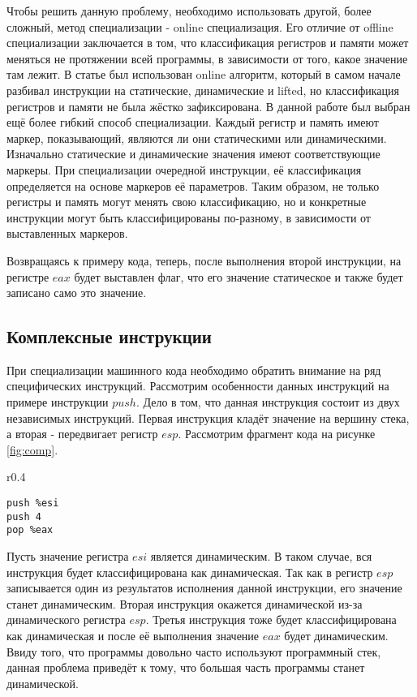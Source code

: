 Чтобы решить данную проблему, необходимо использовать другой, более сложный, метод специализации - online специализация. Его отличие от offline специализации заключается в том, что классификация регистров и памяти может меняться не протяжении всей программы, в зависимости от того, какое значение там лежит. В статье \cite{PEMC} был использован online алгоритм, который в самом начале разбивал инструкции на статические, динамические и lifted, но классификация регистров и памяти не была жёстко зафиксирована. В данной работе был выбран ещё более гибкий способ специализации. Каждый регистр и память имеют маркер, показывающий, являются ли они статическими или динамическими. Изначально статические и динамические значения имеют соответствующие маркеры. При специализации очередной инструкции, её классификация определяется на основе маркеров её параметров. Таким образом, не только регистры и память могут менять свою классификацию, но и конкретные инструкции могут быть классифицированы по-разному, в зависимости от выставленных маркеров.

Возвращаясь к примеру кода, теперь, после выполнения второй инструкции, на регистре $eax$ будет выставлен флаг, что его значение статическое и также будет записано само это значение.

\subsection{ Комплексные инструкции}
\label{part:4.2}
При специализации машинного кода необходимо обратить внимание на ряд специфических инструкций. Рассмотрим особенности данных инструкций на примере инструкции $push$. Дело в том, что данная инструкция состоит из двух независимых инструкций. Первая инструкция кладёт значение на вершину стека, а вторая - передвигает регистр $esp$. Рассмотрим фрагмент кода на рисунке \ref{fig:comp}.
\begin{wrapfigure}{r}{0.4\textwidth}
\begin{lstlisting}[xleftmargin = 20pt]
push %esi
push 4
pop %eax
\end{lstlisting}
\caption{Фрагмент кода}
\label{fig:comp}
\end{wrapfigure}
Пусть значение регистра $esi$ является динамическим. В таком случае, вся инструкция будет классифицирована как динамическая. Так как в регистр $esp$ записывается один из результатов исполнения данной инструкции, его значение станет динамическим. Вторая инструкция окажется динамической из-за динамического регистра $esp$. Третья инструкция тоже будет классифицирована как  динамическая и после её выполнения значение $eax$ будет динамическим. Ввиду того, что программы довольно часто используют программный стек, данная проблема приведёт к тому, что большая часть программы станет динамической.

